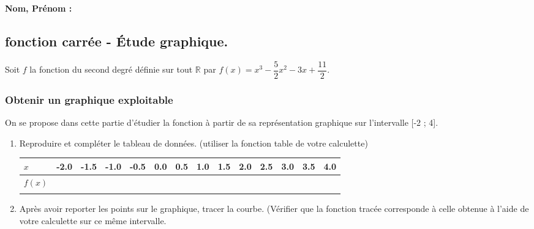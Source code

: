 \documentclass[paper=a4, fontsize=9pt]{scrartcl} %
\begin{document}

\newtheorem{Definition}{Définition}
\newtheorem{Theorem}{Théorème}
\newtheorem{Proposition}{Propriété}

\renewcommand{\labelitemi}{$\bullet$}
\renewcommand{\labelitemii}{$\circ$}

\setlength{\columnseprule}{1pt}

\textbf{Nom, Prénom :}

\subsection*{fonction carrée - Étude graphique.}

Soit $f$ la fonction du second degré définie sur tout $\mathbb{R}$ par $f(x) = x^3 - \dfrac{5}{2}x^2 - 3x + \dfrac{11}{2}$.

\subsubsection*{Obtenir un graphique exploitable}

On se propose dans cette partie d'étudier la fonction à partir de sa représentation graphique sur l'intervalle [-2 ; 4].

\begin{enumerate}
\item Reproduire et compléter le tableau de données. (utiliser la fonction table de votre calculette)
  \begin{center}
    \begin{tabular}{| l || c | c | c | c | c | c | c | c| c | c | c | c | c |}
      \hline
      $x$ & -2.0 & -1.5 & -1.0 & -0.5 & 0.0 & 0.5 & 1.0 & 1.5 & 2.0 & 2.5 & 3.0 & 3.5 & 4.0\\
      \hline
      $f(x)$ &  &  &  &  &  &  &  &  &  &  &  &  & \\
             &  &  &  &  &  &  &  &  &  &  &  &  & \\

      \hline
    \end{tabular}
  \end{center}

\item Après avoir reporter les points sur le graphique, tracer la courbe. (Vérifier que la fonction tracée corresponde à celle obtenue à l'aide de votre calculette sur ce même intervalle.
\end{enumerate}
\end{document}
